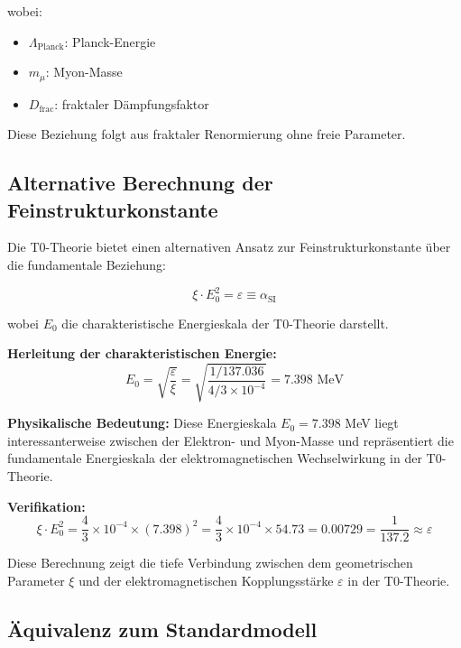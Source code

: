 \documentclass[12pt,a4paper]{article}
\numberwithin{equation}{section}
\newcommand{\xipar}{\xi}
\newcommand{\epsilonT}{\varepsilon}
\newcommand{\alphaSI}{\alpha_{\text{SI}}}
\newcommand{\Eo}{E_0}
\begin{document}
	wobei:
	\begin{itemize}
		\item $\Lambda_{\text{Planck}}$: Planck-Energie
		\item $m_\mu$: Myon-Masse  
		\item $D_{\text{frac}}$: fraktaler Dämpfungsfaktor
	\end{itemize}
	
	Diese Beziehung folgt aus fraktaler Renormierung ohne freie Parameter.
	
	\subsection{Alternative Berechnung der Feinstrukturkonstante}
	
	Die T0-Theorie bietet einen alternativen Ansatz zur Feinstrukturkonstante über die fundamentale Beziehung:
	
	\begin{equation}
		\xipar \cdot \Eo^2 = \epsilonT \equiv \alphaSI
		\label{eq:alpha_alternative}
	\end{equation}
	
	wobei $\Eo$ die charakteristische Energieskala der T0-Theorie darstellt.
	
	\textbf{Herleitung der charakteristischen Energie:}
	\begin{equation}
		\Eo = \sqrt{\frac{ \epsilonT}{\xipar}} = \sqrt{\frac{1/137.036}{4/3 \times 10^{-4}}} = 7.398 \text{ MeV}
		\label{eq:e0_derivation}
	\end{equation}
	
	\textbf{Physikalische Bedeutung:}
	Diese Energieskala $\Eo = 7.398$ MeV liegt interessanterweise zwischen der Elektron- und Myon-Masse und repräsentiert die fundamentale Energieskala der elektromagnetischen Wechselwirkung in der T0-Theorie.
	
	\textbf{Verifikation:}
	\begin{equation}
		\xipar \cdot \Eo^2 = \frac{4}{3} \times 10^{-4} \times (7.398)^2 = \frac{4}{3} \times 10^{-4} \times 54.73 = 0.00729 = \frac{1}{137.2} \approx  \epsilonT
		\label{eq:alpha_verification}
	\end{equation}
	
	Diese Berechnung zeigt die tiefe Verbindung zwischen dem geometrischen Parameter $\xipar$ und der elektromagnetischen Kopplungsstärke $ \epsilonT$ in der T0-Theorie.
	
	\subsection{Äquivalenz zum Standardmodell}
	
\end{document}

